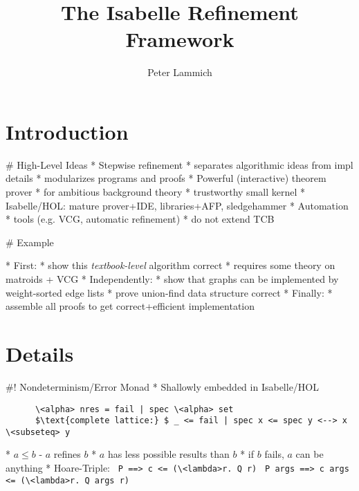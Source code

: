 \documentclass[fleqn]{beamer}
\title{The Isabelle Refinement Framework}
\author[Peter Lammich]{Peter Lammich}
\newcommand{\high}[1]{{\color{blue}#1}}
\begin{document}
% 

\begin{frame}
  \titlepage
\end{frame}


\newcommand{\insertsectitle}{}

\setbeamertemplate{frametitle}{\vspace{.7em}\insertframetitle\hfill \small\raisebox{10pt}{\insertsectitle}}

\section{Introduction}

# High-Level Ideas
  * Stepwise refinement
    * separates algorithmic ideas from impl details
    * modularizes programs and proofs
  * Powerful (interactive) theorem prover
    * for ambitious background theory
    * trustworthy small kernel
    * Isabelle/HOL: mature prover+IDE, libraries+AFP, sledgehammer
  * Automation
    * tools (e.g. VCG, automatic refinement)
    * do \high{not} extend TCB

# Example

  \begin{algorithmic}
        \EndIf
      \EndWhile
    \EndProcedure
  \end{algorithmic}


  * First:
    * show this \emph{textbook-level} algorithm correct
    * requires some theory on matroids + VCG
  * Independently:
    * show that graphs can be implemented by weight-sorted edge lists
    * prove union-find data structure correct
  * Finally:
    * assemble all proofs to get correct+efficient implementation

\section{Details}

#! Nondeterminism/Error Monad
  * Shallowly embedded in Isabelle/HOL
    \begin{lstlisting}
      \<alpha> nres = fail | spec \<alpha> set
      $\text{complete lattice:} $ _ <= fail | spec x <= spec y <--> x \<subseteq> y
    \end{lstlisting}
  * $a \le b$ - $a$ refines $b$
    * $a$ has less possible results than $b$
    * if $b$ fails, $a$ can be anything
  * Hoare-Triple:
    \lstinline{ P ==> c <= (\<lambda>r. Q r)} \lstinline{ P args ==> c args <= (\<lambda>r. Q args r)}
\end{document}

